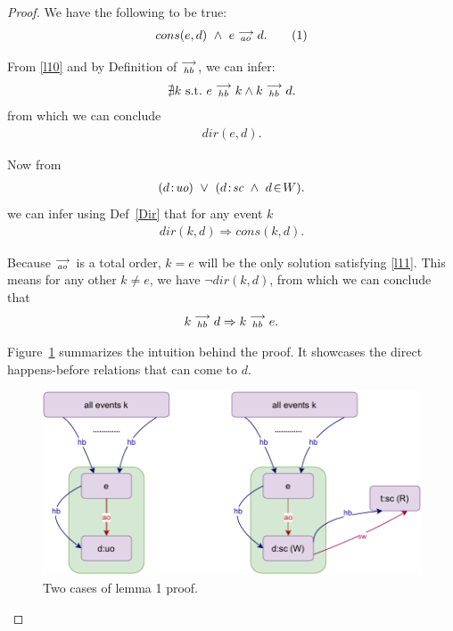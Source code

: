 \begin{proof}
    
    We have the following to be true:
    \begin{align*}
        cons(e,d) \ \wedge \ e\stackrel{\longrightarrow}{_{ao}}d.
        \tag{1}
        \label{l10}
    \end{align*}

    From \ref{l10} and by Definition of $\stackrel{\longrightarrow}{_{hb}}$, we can infer:
    \begin{align*}
        \nexists k \ \text{s.t.} \ e\stackrel{\longrightarrow}{_{hb}}k \wedge k\stackrel{\longrightarrow}{_{hb}}d.
    \end{align*}
    from which we can conclude 
    \begin{align*}
        dir(e,d).
    \end{align*}

    Now from 
    \begin{align*}
        (d\!:\!\textit{uo}) \ \vee \
        (d\!:\!\textit{sc} \ \wedge \ d\!\in\!W).
    \end{align*}
    we can infer using Def~\ref{Dir} that for any event $k$
    \begin{align*}
        dir(k,d) \Rightarrow cons(k,d).
        \tag{2}
        \label{l11}
    \end{align*}

    Because $\stackrel{\longrightarrow}{_{ao}}$ is a total order, $k=e$ will be the only solution satisfying \ref{l11}.  
    This means for any other $k \neq e$, we have $\neg dir(k,d)$, from which we can conclude that     
    \begin{align*}
        k\stackrel{\longrightarrow}{_{hb}}d \Rightarrow k\stackrel{\longrightarrow}{_{hb}}e.
    \end{align*}
    
    Figure~\ref{lemma:first} summarizes the intuition behind the proof.
    It showcases the direct happens-before relations that can come to $d$. 
    \begin{figure}[H]
        \centering
        \includegraphics[scale=0.7]{4.InstructionReordering/3.Lemmas/Lemma1.pdf}
        \caption{Two cases of lemma 1 proof.}
        \label{lemma:first}
    \end{figure}
    
\end{proof}

